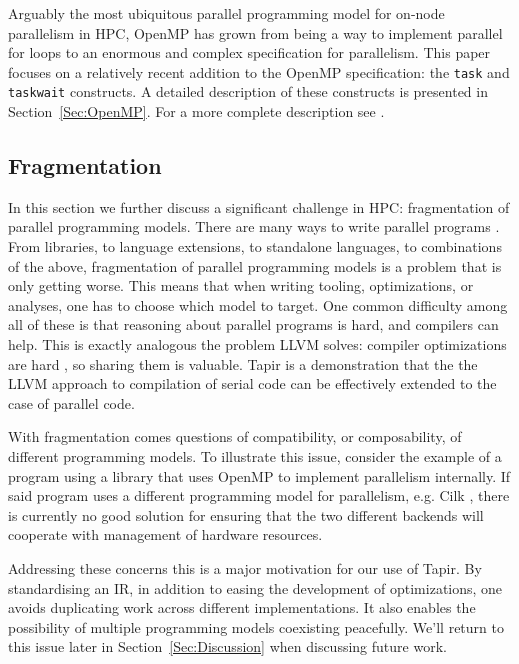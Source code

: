 \documentclass[sigconf]{acmart}
\begin{document}
Arguably the most ubiquitous parallel programming model for on-node parallelism
in HPC, OpenMP has grown from being a way to implement parallel for loops to an
enormous and complex specification for parallelism. This paper focuses on a 
relatively recent addition to the OpenMP specification: the \texttt{task}
and \texttt{taskwait} constructs. A detailed description of these constructs
is presented in Section~\ref{Sec:OpenMP}. For a more complete description see
\cite{spec}.

\subsection{Fragmentation}

In this section we further discuss a significant challenge in HPC:
fragmentation of parallel programming models. There are many ways to write
parallel programs \cite{spec, qthreads, chapel, cilk, kokkos, legion}. From
libraries, to language extensions, to standalone languages, to combinations of
the above, fragmentation of parallel programming models is a problem that is
only getting worse. This means that when writing tooling, optimizations, or
analyses, one has to choose which model to target. One common difficulty among
all of these is that reasoning about parallel programs is hard, and compilers
can help. This is exactly analogous the problem LLVM solves: compiler
optimizations are hard , so sharing them is valuable. Tapir is a demonstration
that the the LLVM approach to compilation of serial code can be effectively
extended to the case of parallel code. 

With fragmentation comes questions of compatibility, or composability, of 
different programming models. To illustrate this issue, consider the example of
a program using a library that uses OpenMP to implement parallelism internally. 
If said program uses a different programming model for parallelism, e.g. Cilk
, there is currently no good solution for ensuring that the two different backends
will cooperate with management of hardware resources. 

Addressing these concerns this is a major motivation for our use of Tapir.
By standardising an IR, in addition to easing the development of optimizations,
one avoids duplicating work across different implementations. It also enables
the possibility of multiple programming models coexisting peacefully. We'll
return to this issue later in Section~\ref{Sec:Discussion} when discussing
future work.
\end{document}
